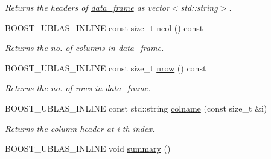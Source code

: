\begin{DoxyCompactItemize}
\begin{DoxyCompactList}\small\item\em Returns the headers of \hyperlink{classboost_1_1numeric_1_1ublas_1_1data__frame}{data\+\_\+frame} as vector$<$std\+::string$>$. \end{DoxyCompactList}\item 
B\+O\+O\+S\+T\+\_\+\+U\+B\+L\+A\+S\+\_\+\+I\+N\+L\+I\+NE const size\+\_\+t \hyperlink{classboost_1_1numeric_1_1ublas_1_1data__frame_adf7817e6cf0dcc7fa6d892a351b5c9a8}{ncol} () const \hypertarget{classboost_1_1numeric_1_1ublas_1_1data__frame_adf7817e6cf0dcc7fa6d892a351b5c9a8}{}\label{classboost_1_1numeric_1_1ublas_1_1data__frame_adf7817e6cf0dcc7fa6d892a351b5c9a8}

\begin{DoxyCompactList}\small\item\em Returns the no. of columns in \hyperlink{classboost_1_1numeric_1_1ublas_1_1data__frame}{data\+\_\+frame}. \end{DoxyCompactList}\item 
B\+O\+O\+S\+T\+\_\+\+U\+B\+L\+A\+S\+\_\+\+I\+N\+L\+I\+NE const size\+\_\+t \hyperlink{classboost_1_1numeric_1_1ublas_1_1data__frame_a7f773294cbd41d890b5469e2a85abd32}{nrow} () const \hypertarget{classboost_1_1numeric_1_1ublas_1_1data__frame_a7f773294cbd41d890b5469e2a85abd32}{}\label{classboost_1_1numeric_1_1ublas_1_1data__frame_a7f773294cbd41d890b5469e2a85abd32}

\begin{DoxyCompactList}\small\item\em Returns the no. of rows in \hyperlink{classboost_1_1numeric_1_1ublas_1_1data__frame}{data\+\_\+frame}. \end{DoxyCompactList}\item 
B\+O\+O\+S\+T\+\_\+\+U\+B\+L\+A\+S\+\_\+\+I\+N\+L\+I\+NE const std\+::string \hyperlink{classboost_1_1numeric_1_1ublas_1_1data__frame_abda7571a20f64b31d627d3fb2f7956fb}{colname} (const size\+\_\+t \&i)\hypertarget{classboost_1_1numeric_1_1ublas_1_1data__frame_abda7571a20f64b31d627d3fb2f7956fb}{}\label{classboost_1_1numeric_1_1ublas_1_1data__frame_abda7571a20f64b31d627d3fb2f7956fb}

\begin{DoxyCompactList}\small\item\em Returns the column header at i-\/th index. \end{DoxyCompactList}\item 
B\+O\+O\+S\+T\+\_\+\+U\+B\+L\+A\+S\+\_\+\+I\+N\+L\+I\+NE void \hyperlink{classboost_1_1numeric_1_1ublas_1_1data__frame_a9d94261a11a013b3bcf883dec199e6fd}{summary} ()\hypertarget{classboost_1_1numeric_1_1ublas_1_1data__frame_a9d94261a11a013b3bcf883dec199e6fd}{}\label{classboost_1_1numeric_1_1ublas_1_1data__frame_a9d94261a11a013b3bcf883dec199e6fd}


\end{DoxyCompactItemize}
